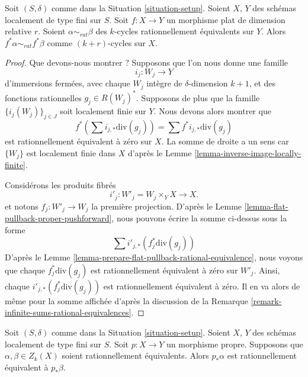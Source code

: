 \begin{lemma}
\label{lemma-flat-pullback-rational-equivalence}
Soit $(S, \delta)$ comme dans la Situation \ref{situation-setup}.
Soient $X$, $Y$ des schémas localement de type fini sur $S$.
Soit $f : X \to Y$ un morphisme plat de dimension relative $r$.
Soient $\alpha \sim_{rat} \beta$ des $k$-cycles rationnellement équivalents sur $Y$.
Alors $f^*\alpha \sim_{rat} f^*\beta$ comme $(k + r)$-cycles sur $X$.
\end{lemma}

\begin{proof}
Que devons-nous montrer ? Supposons que l'on nous donne une famille
$$
i_j : W_j \longrightarrow Y
$$
d'immersions fermées, avec chaque $W_j$ intègre de $\delta$-dimension $k + 1$,
et des fonctions rationnelles $g_j \in R(W_j)^*$. Supposons de plus que
la famille $\{i_j(W_j)\}_{j \in J}$ soit localement finie sur $Y$.
Nous devons alors montrer que
$$
f^*(\sum i_{j, *}\text{div}(g_j)) = \sum f^*i_{j, *}\text{div}(g_j)
$$
est rationnellement équivalent à zéro sur $X$. La somme de droite
a un sens car $\{W_j\}$ est localement finie dans $X$ d'après le
Lemme \ref{lemma-inverse-image-locally-finite}.

\medskip\noindent
Considérons les produits fibrés
$$
i'_j : W'_j = W_j \times_Y X \longrightarrow X.
$$
et notons $f_j : W'_j \to W_j$ la première projection.
D'après le Lemme \ref{lemma-flat-pullback-proper-pushforward},
nous pouvons écrire la somme ci-dessus sous la forme
$$
\sum i'_{j, *}(f_j^*\text{div}(g_j))
$$
D'après le Lemme \ref{lemma-prepare-flat-pullback-rational-equivalence},
nous voyons que chaque $f_j^*\text{div}(g_j)$ est rationnellement équivalent
à zéro sur $W'_j$. Ainsi, chaque $i'_{j, *}(f_j^*\text{div}(g_j))$
est rationnellement équivalent à zéro. Il en va alors de même pour
la somme affichée d'après la discussion de la
Remarque \ref{remark-infinite-sums-rational-equivalences}.
\end{proof}

\begin{lemma}
\label{lemma-proper-pushforward-rational-equivalence}
Soit $(S, \delta)$ comme dans la Situation \ref{situation-setup}.
Soient $X$, $Y$ des schémas localement de type fini sur $S$.
Soit $p : X \to Y$ un morphisme propre.
Supposons que $\alpha, \beta \in Z_k(X)$ soient rationnellement équivalents.
Alors $p_*\alpha$ est rationnellement équivalent à $p_*\beta$.
\end{lemma}

